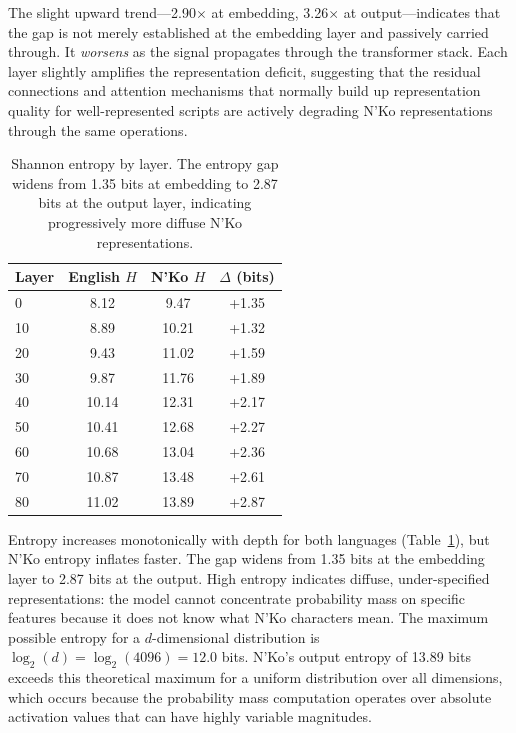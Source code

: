 \documentclass[11pt]{article}
\begin{document}
The slight upward trend---2.90$\times$ at embedding, 3.26$\times$ at output---indicates that the gap is not merely established at the embedding layer and passively carried through.
It \emph{worsens} as the signal propagates through the transformer stack.
Each layer slightly amplifies the representation deficit, suggesting that the residual connections and attention mechanisms that normally build up representation quality for well-represented scripts are actively degrading N'Ko representations through the same operations.

\begin{table}[t]
\centering
\small
\begin{tabular}{lccc}
\toprule
\textbf{Layer} & \textbf{English $H$} & \textbf{N'Ko $H$} & \textbf{$\Delta$ (bits)} \\
\midrule
0 & 8.12 & 9.47 & +1.35 \\
10 & 8.89 & 10.21 & +1.32 \\
20 & 9.43 & 11.02 & +1.59 \\
30 & 9.87 & 11.76 & +1.89 \\
40 & 10.14 & 12.31 & +2.17 \\
50 & 10.41 & 12.68 & +2.27 \\
60 & 10.68 & 13.04 & +2.36 \\
70 & 10.87 & 13.48 & +2.61 \\
80 & 11.02 & 13.89 & +2.87 \\
\bottomrule
\end{tabular}
\caption{Shannon entropy by layer. The entropy gap widens from 1.35 bits at embedding to 2.87 bits at the output layer, indicating progressively more diffuse N'Ko representations.}
\label{tab:entropy}
\end{table}

Entropy increases monotonically with depth for both languages (Table~\ref{tab:entropy}), but N'Ko entropy inflates faster.
The gap widens from 1.35 bits at the embedding layer to 2.87 bits at the output.
High entropy indicates diffuse, under-specified representations: the model cannot concentrate probability mass on specific features because it does not know what N'Ko characters mean.
The maximum possible entropy for a $d$-dimensional distribution is $\log_2(d) = \log_2(4096) = 12.0$ bits.
N'Ko's output entropy of 13.89 bits exceeds this theoretical maximum for a uniform distribution over all dimensions, which occurs because the probability mass computation operates over absolute activation values that can have highly variable magnitudes.
\end{document}
